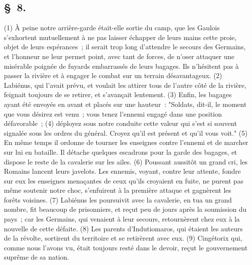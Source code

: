 \documentclass[french,twoside]{book} %
\begin{document}
\subsection[{§ 8.}]{ \textsc{§ 8.} }
\noindent (1) À peine notre arrière-garde était-elle sortie du camp, que les Gaulois s’exhortent mutuellement à ne pas laisser échapper de leurs mains cette proie, objet de leurs espérances ; il serait trop long d’attendre le secours des Germains, et l’honneur ne leur permet point, avec tant de forces, de n’oser attaquer une misérable poignée de fuyards embarrassés de leurs bagages. Ils n’hésitent pas à passer la rivière et à engager le combat sur un terrain désavantageux. (2) Labiénus, qui l’avait prévu, et voulait les attirer tous de l’autre côté de la rivière, feignait toujours de se retirer, et s’avançait lentement. (3) Enfin, les bagages ayant été envoyés en avant et placés sur une hauteur : "Soldats, dit-il, le moment que vous désirez est venu ; vous tenez l’ennemi engagé dans une position défavorable ; (4) déployez sous notre conduite cette valeur qui s’est si souvent signalée sous les ordres du général. Croyez qu’il est présent et qu’il vous voit." (5) En même temps il ordonne de tourner les enseignes contre l’ennemi et de marcher sur lui en bataille. Il détache quelques escadrons pour la garde des bagages, et dispose le reste de la cavalerie sur les ailes. (6) Poussant aussitôt un grand cri, les Romains lancent leurs javelots. Les ennemis, voyant, contre leur attente, fondre sur eux les enseignes menaçantes de ceux qu’ils croyaient en fuite, ne purent pas même soutenir notre choc, s’enfuirent à la première attaque et gagnèrent les forêts voisines. (7) Labiénus les poursuivit avec la cavalerie, en tua un grand nombre, fit beaucoup de prisonniers, et reçut peu de jours après la soumission du pays ; car les Germains, qui venaient à leur secours, retournèrent chez eux à la nouvelle de cette défaite. (8) Les parents d’Indutiomaros, qui étaient les auteurs de la révolte, sortirent du territoire et se retirèrent avec eux. (9) Cingétorix qui, comme nous l’avons vu, était toujours resté dans le devoir, reçut le gouvernement suprême de sa nation.
\end{document}
